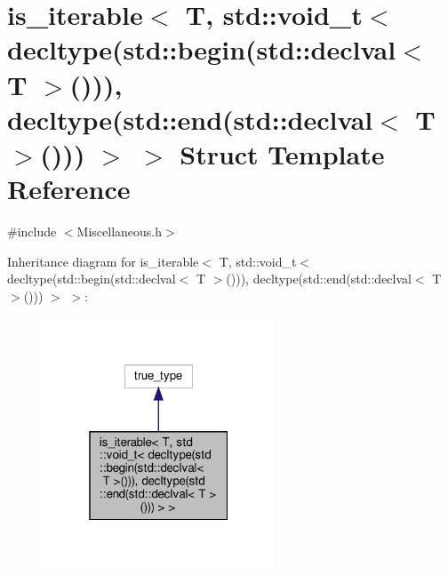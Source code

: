 \hypertarget{structis__iterable_3_01_t_00_01std_1_1void__t_3_01decltype_07std_1_1begin_07std_1_1declval_3_01_6e9fb167ef7cf6be085c68f3355f458c}{}\section{is\+\_\+iterable$<$ T, std\+:\+:void\+\_\+t$<$ decltype(std\+:\+:begin(std\+:\+:declval$<$ T $>$())), decltype(std\+:\+:end(std\+:\+:declval$<$ T $>$())) $>$ $>$ Struct Template Reference}
\label{structis__iterable_3_01_t_00_01std_1_1void__t_3_01decltype_07std_1_1begin_07std_1_1declval_3_01_6e9fb167ef7cf6be085c68f3355f458c}


{\ttfamily \#include $<$Miscellaneous.\+h$>$}



Inheritance diagram for is\+\_\+iterable$<$ T, std\+:\+:void\+\_\+t$<$ decltype(std\+:\+:begin(std\+:\+:declval$<$ T $>$())), decltype(std\+:\+:end(std\+:\+:declval$<$ T $>$())) $>$ $>$\+:
\nopagebreak
\begin{figure}[H]
\begin{center}
\leavevmode
\includegraphics[width=196pt]{structis__iterable_3_01_t_00_01std_1_1void__t_3_01decltype_07std_1_1begin_07std_1_1declval_3_01_b7a4ab461bf675bfc11c691a48b8d31c}
\end{center}
\end{figure}


